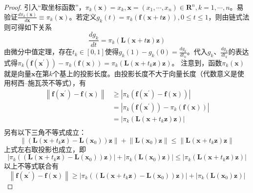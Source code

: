 \documentclass[main.tex]{subfiles}
\begin{document}
\begin{proof}
    引入“取坐标函数”，$\pi_k\left(\mathbf{x}\right)=x_k,\mathbf{x}=\left(x_1,\cdots,x_n\right)\in\mathbf{R}^n,k=1,\cdots,n$。易验证$\frac{d\pi_k\left(\mathbf{x}\right)}{d\mathbf{x}}\equiv\pi_k\left(\mathbf{x}\right)$。若定义$g_k\left(t\right)=\pi_k\left(\mathbf{f}\left(\mathbf{x}+t\mathbf{z}\right)\right),0\leq t\leq 1$，则由链式法则可得如下关系
    \[
        \frac{dg_k}{dt}=\pi_k\left(\mathbf{L}\left(\mathbf{x}+t\mathbf{z}\right)\mathbf{z}\right)\]
    由微分中值定理，存在$t_k\in\left[0,1\right]$使得$g_k\left(1\right)-g_k\left(0\right)=\frac{dg_k}{dt_k}$。代入$g_k$、$\frac{dg_k}{dt_k}$的表达式得$\pi_k\left(\mathbf{f}\left(\mathbf{x}^\prime\right)\right)-\pi_k\left(\mathbf{f}\left(\mathbf{x}\right)\right)=\pi_k\left(\mathbf{L}\left(\mathbf{x}+t_k\mathbf{z}\right)\mathbf{z}\right)$。
    注意到，函数$\pi_k\left(\mathbf{x}\right)$就是向量$\mathbf{x}$在第$k$个基上的投影长度。由投影长度不大于向量长度（代数意义是使用柯西--施瓦茨不等式），有
    \begin{align*}
        \left\|\mathbf{f}\left(\mathbf{x}^\prime\right)-\mathbf{f}\left(\mathbf{x}\right)\right\| & \geq\left|\pi_k\left(\mathbf{f}\left(\mathbf{x}^\prime\right)-\mathbf{f}\left(\mathbf{x}\right)\right)\right|                \\
                                                                                                  & =\left|\pi_k\left(\mathbf{f}\left(\mathbf{x}^\prime\right)\right)-\pi_k\left(\mathbf{f}\left(\mathbf{x}\right)\right)\right| \\
                                                                                                  & =\left|\pi_k\left(\mathbf{L}\left(\mathbf{x}+t_k\mathbf{z}\right)\mathbf{z}\right)\right|                                    \\
    \end{align*}
    另有以下三角不等式成立：
    \[
        \left\|\left(\mathbf{L}\left(\mathbf{x}+t_k\mathbf{z}\right)-\mathbf{L}\left(\mathbf{x}_0\right)\right)\mathbf{z}\right\|+\left\|\mathbf{L}\left(\mathbf{x}_0\right)\mathbf{z}\right\|\leq\left\|\mathbf{L}\left(\mathbf{x}+t_k\mathbf{z}\right)\mathbf{z}\right\|
    \]
    上式左右取投影也成立，即
    \[\left|\pi_k\left(\left(\mathbf{L}\left(\mathbf{x}+t_k\mathbf{z}\right)-\mathbf{L}\left(\mathbf{x}_0\right)\right)\mathbf{z}\right)\right|+\left|\pi_k\left(\mathbf{L}\left(\mathbf{x}_0\right)\mathbf{z}\right)\right|\leq\left|\pi_k\left(\mathbf{L}\left(\mathbf{x}+t_k\mathbf{z}\right)\mathbf{z}\right)\right|
    \]
    以上不等式联合有
    \[
        \left\|\mathbf{f}\left(\mathbf{x}^\prime\right)-\mathbf{f}\left(\mathbf{x}\right)\right\|\geq\left|\pi_k\left(\left(\mathbf{L}\left(\mathbf{x}+t_k\mathbf{z}\right)-\mathbf{L}\left(\mathbf{x}_0\right)\right)\mathbf{z}\right)\right|+\left|\pi_k\left(\mathbf{L}\left(\mathbf{x}_0\right)\mathbf{z}\right)\right|
\]
\end{proof}
\end{document}
